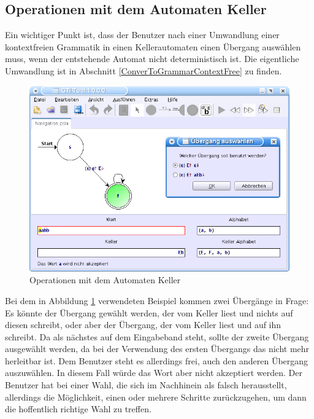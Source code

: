 \subsection{Operationen mit dem Automaten Keller}\label{InteractionPDA}

Ein wichtiger Punkt ist, dass der Benutzer nach einer Umwandlung einer
kontextfreien Grammatik in einen Kellerautomaten einen Übergang auswählen muss,
wenn der entstehende Automat nicht deterministisch ist. Die eigentliche
Umwandlung ist in Abschnitt \ref{ConverToGrammarContextFree} zu
finden.\vspace{10pt}

\begin{figure}[h!]
\begin{center}
\includegraphics[width=12cm]{../images/grammar_pda.png}
\caption{Operationen mit dem Automaten Keller}
\label{FigureGrammarPDA}
\end{center}
\end{figure}
\vspace{10pt}

Bei dem in Abbildung \ref{FigureGrammarPDA} verwendeten Beispiel kommen zwei
Übergänge in Frage: Es könnte der Übergang gewählt werden, der  vom
Keller liest und nichts auf diesen schreibt, oder aber der Übergang, der
 vom Keller liest und  auf ihn schreibt.
Da  als nächstes auf dem Eingabeband steht, sollte der zweite Übergang
ausgewählt werden, da bei der Verwendung des ersten Übergangs das 
nicht mehr herleitbar ist. Dem Benutzer steht es allerdings frei, auch den
anderen Übergang auszuwählen. In diesem Fall würde das Wort
 aber nicht akzeptiert werden. Der
Benutzer hat bei einer Wahl, die sich im Nachhinein als falsch herausstellt,
allerdings die Möglichkeit, einen oder mehrere Schritte zurückzugehen, um dann
die hoffentlich richtige Wahl zu treffen.\vspace{10pt}


